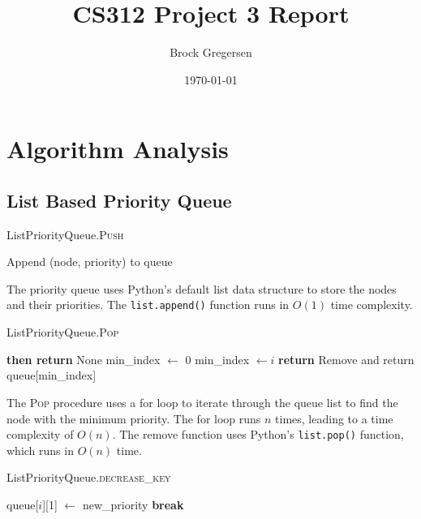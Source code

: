 \documentclass[12pt]{article}
\title{CS312 Project 3 Report}
\author{Brock Gregersen}
\date{\today}
\begin{document}
\maketitle
\tableofcontents

\newpage

\section{Algorithm Analysis}

\subsection{List Based Priority Queue}

\begin{algorithm}
    \caption{ListPriorityQueue.\textsc{Push}}
    \begin{algorithmic}[1]
        \State Append (node, priority) to queue
    \end{algorithmic}
\end{algorithm}

The priority queue uses Python's default list data structure to store the nodes
and their priorities. The \texttt{list.append()} function runs in $O(1)$ time complexity.

\begin{algorithm}[H]
    \caption{ListPriorityQueue.\textsc{Pop}}
    \begin{algorithmic}[1]
            \State \textbf{then return} None
        \EndIf
        \State min\_index $\gets$ 0
         
                \State min\_index $\gets i$
            \EndIf
        \EndFor
        \State \textbf{return} Remove and return queue[min\_index]
    \end{algorithmic}
\end{algorithm}

The \textsc{Pop} procedure uses a for loop to iterate through the queue list
to find the node with the minimum priority. The for loop runs $n$ times, leading
to a time complexity of $O(n)$. The remove function uses Python's \texttt{list.pop()}
function, which runs in $O(n)$ time.

\begin{algorithm}[H]
    \caption{ListPriorityQueue.\textsc{decrease\_key}}
    \begin{algorithmic}[1]
         
                \State queue[$i$][1] $\gets$ new\_priority
                \State \textbf{break}
            \EndIf
        \EndFor
    \end{algorithmic}
\end{algorithm}
\end{document}
